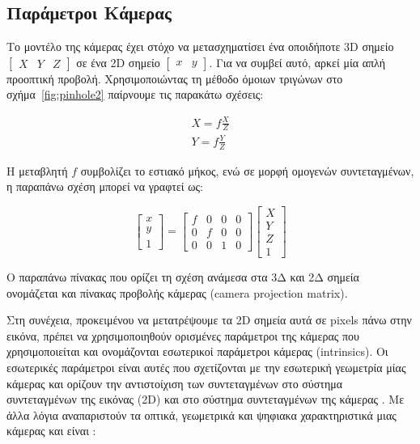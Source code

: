 \subsection{Παράμετροι Κάμερας}

Το μοντέλο της κάμερας έχει στόχο να μετασχηματίσει ένα οποιδήποτε 3D σημείο $\begin{bmatrix} X & Y & Z \end{bmatrix}$ σε ένα 2D σημείο $\begin{bmatrix} x & y\end{bmatrix}$. Για να συμβεί αυτό, αρκεί μία απλή προοπτική προβολή. Χρησιμοποιώντας τη μέθοδο όμοιων τριγώνων στο σχήμα~\ref{fig:pinhole2} παίρνουμε τις παρακάτω σχέσεις:


\begin{equation}
\begin{aligned}
X=f\frac{X}{Z}\\[0.2cm] 
Y=f\frac{Y}{Z}
\end{aligned}
\end{equation}


Η μεταβλητή $f$ συμβολίζει το εστιακό μήκος, ενώ σε μορφή ομογενών συντεταγμένων, η παραπάνω σχέση μπορεί να γραφτεί ως:

\begin{equation}
\begin{bmatrix}
x\\y\\1
\end{bmatrix}
=
\begin{bmatrix}
f & 0 & 0 & 0\\
0 & f & 0 & 0\\
0 & 0 & 1 & 0
\end{bmatrix}
\begin{bmatrix}
X\\
Y\\
Z\\
1
\end{bmatrix}
\end{equation}


Ο παραπάνω πίνακας που ορίζει τη σχέση ανάμεσα στα 3Δ και 2Δ σημεία ονομάζεται και πίνακας προβολής κάμερας (camera projection matrix).







Στη συνέχεια, προκειμένου να μετατρέψουμε τα 2D σημεία αυτά σε pixels πάνω στην εικόνα, πρέπει να χρησιμοποιηθούν ορισμένες παράμετροι της κάμερας που χρησιμοποιείται και ονομάζονται εσωτερικοί παράμετροι κάμερας (intrinsics).
Οι εσωτερικές παράμετροι είναι αυτές που σχετίζονται με την εσωτερική γεωμετρία μίας κάμερας και ορίζουν την αντιστοίχιση των συντεταγμένων στο σύστημα συντεταγμένων της εικόνας (2D) και στο σύστημα συντεταγμένων της κάμερας \cite{Malik2002}. Με άλλα λόγια αναπαριστούν τα οπτικά, γεωμετρικά και ψηφιακα χαρακτηριστικά μιας κάμερας και είναι :


